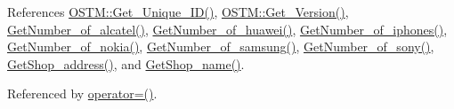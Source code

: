 References \hyperlink{_o_s_t_m_8cpp_source_l00073}{O\+S\+T\+M\+::\+Get\+\_\+\+Unique\+\_\+\+I\+D()}, \hyperlink{_o_s_t_m_8cpp_source_l00089}{O\+S\+T\+M\+::\+Get\+\_\+\+Version()}, \hyperlink{_k_i_l_k_e_n_n_y___w_8cpp_source_l00073}{Get\+Number\+\_\+of\+\_\+alcatel()}, \hyperlink{_k_i_l_k_e_n_n_y___w_8cpp_source_l00089}{Get\+Number\+\_\+of\+\_\+huawei()}, \hyperlink{_k_i_l_k_e_n_n_y___w_8cpp_source_l00113}{Get\+Number\+\_\+of\+\_\+iphones()}, \hyperlink{_k_i_l_k_e_n_n_y___w_8cpp_source_l00081}{Get\+Number\+\_\+of\+\_\+nokia()}, \hyperlink{_k_i_l_k_e_n_n_y___w_8cpp_source_l00105}{Get\+Number\+\_\+of\+\_\+samsung()}, \hyperlink{_k_i_l_k_e_n_n_y___w_8cpp_source_l00097}{Get\+Number\+\_\+of\+\_\+sony()}, \hyperlink{_k_i_l_k_e_n_n_y___w_8cpp_source_l00129}{Get\+Shop\+\_\+address()}, and \hyperlink{_k_i_l_k_e_n_n_y___w_8cpp_source_l00121}{Get\+Shop\+\_\+name()}.



Referenced by \hyperlink{_k_i_l_k_e_n_n_y___w_8h_source_l00075}{operator=()}.


